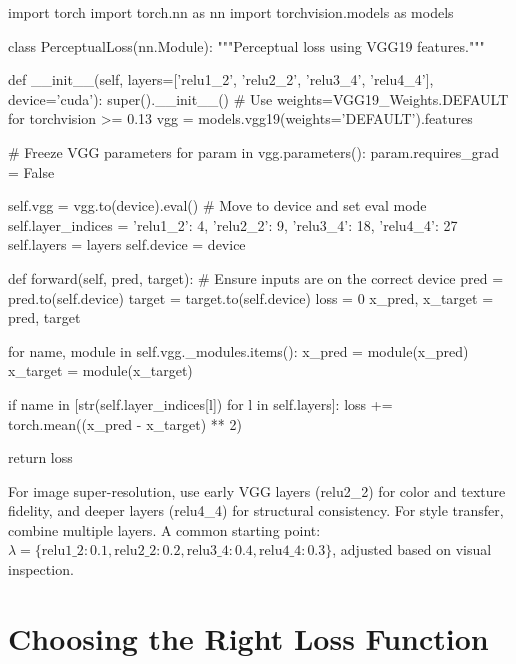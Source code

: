 \documentclass[../../main.tex]{subfiles}
\begin{document}
\begin{pythoncode}
import torch
import torch.nn as nn
import torchvision.models as models

class PerceptualLoss(nn.Module):
    """Perceptual loss using VGG19 features."""

    def __init__(self, layers=['relu1_2', 'relu2_2', 'relu3_4', 'relu4_4'],
                 device='cuda'):
        super().__init__()
        # Use weights=VGG19_Weights.DEFAULT for torchvision >= 0.13
        vgg = models.vgg19(weights='DEFAULT').features

        # Freeze VGG parameters
        for param in vgg.parameters():
            param.requires_grad = False

        self.vgg = vgg.to(device).eval()  # Move to device and set eval mode
        self.layer_indices = {'relu1_2': 4, 'relu2_2': 9,
                              'relu3_4': 18, 'relu4_4': 27}
        self.layers = layers
        self.device = device

    def forward(self, pred, target):
        # Ensure inputs are on the correct device
        pred = pred.to(self.device)
        target = target.to(self.device)
        loss = 0
        x_pred, x_target = pred, target

        for name, module in self.vgg._modules.items():
            x_pred = module(x_pred)
            x_target = module(x_target)

            if name in [str(self.layer_indices[l]) for l in self.layers]:
                loss += torch.mean((x_pred - x_target) ** 2)

        return loss
\end{pythoncode}

For image super-resolution, use early VGG layers (relu2\_2) for color and texture fidelity, and deeper layers (relu4\_4) for structural consistency. For style transfer, combine multiple layers. A common starting point: $\lambda = \{\text{relu1\_2}: 0.1, \text{relu2\_2}: 0.2, \text{relu3\_4}: 0.4, \text{relu4\_4}: 0.3\}$, adjusted based on visual inspection.

\section{Choosing the Right Loss Function}
\label{sec:choosing-loss}
\end{document}
